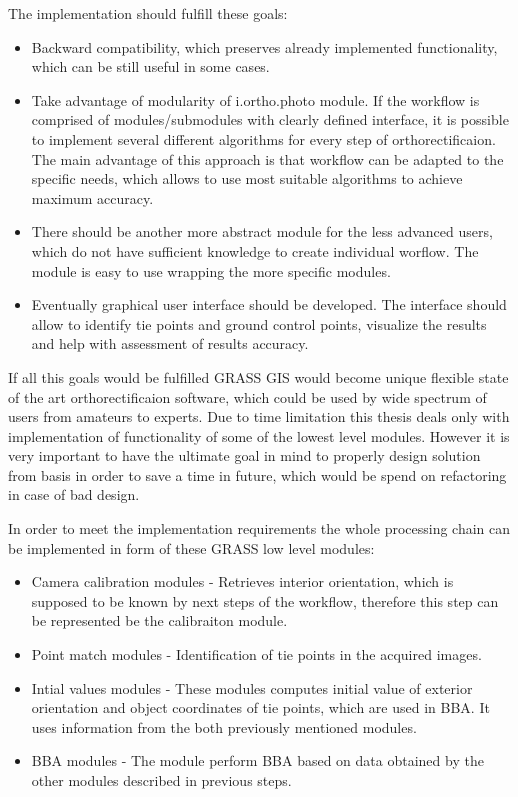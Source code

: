 \documentclass[a4paper,12pt]{article}
\begin{document}
The implementation should fulfill these goals:

\begin{itemize}
\item Backward compatibility, which preserves already implemented functionality, which
can be still useful in some cases. 
\item Take advantage of modularity of i.ortho.photo module.
If the workflow is comprised of modules/submodules with clearly defined interface, it is possible to implement
several different algorithms for every step of orthorectificaion. The main advantage of this 
approach is that workflow can be adapted to the specific needs, which allows to use 
most suitable algorithms to achieve maximum accuracy.
\item There should be another more abstract module for the less advanced users, which do not have sufficient knowledge to create individual 
worflow.
The module is easy to use wrapping the more specific modules.
\item Eventually graphical user interface should be developed. The interface should 
allow to identify tie points and ground control points, visualize the results and help with assessment of results accuracy.  
\end{itemize}

If all this goals would be fulfilled GRASS GIS would become unique flexible state of the art orthorectificaion 
software, which could be used by wide spectrum of users from amateurs to experts.
Due to time limitation this thesis deals only with implementation of functionality of some of the lowest level modules. 
However it is very important to have 
the ultimate goal in mind to properly design solution from basis in order to save a time in future,
which would be spend on refactoring in case of bad design.

In order to meet the implementation requirements the whole processing chain can be implemented in form
of these GRASS low level modules:

\begin{itemize}
\item Camera calibration modules - Retrieves interior orientation, which is supposed to be known by 
next steps of the workflow, therefore this step can be represented be the calibraiton module.
\item Point match modules - Identification of tie points in the acquired images.
\item Intial values modules - These modules computes initial value of exterior orientation and 
object coordinates of tie points, which are used in BBA. It uses information from the both
previously mentioned modules.
\item BBA modules - The module perform BBA based on data obtained by the other modules described in previous steps.
\end{itemize}
\end{document}
